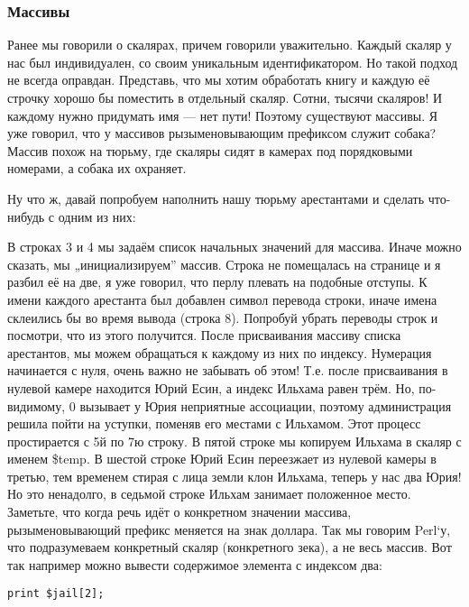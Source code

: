 \subsubsection{Массивы}

Ранее мы говорили о скалярах, причем говорили уважительно. Каждый скаляр 
у нас был индивидуален, со своим уникальным идентификатором. Но такой 
подход не всегда оправдан. Представь, что мы хотим обработать книгу и 
каждую её строчку хорошо бы поместить в отдельный скаляр. Сотни, тысячи 
скаляров! И каждому нужно придумать имя --- нет пути! Поэтому существуют 
массивы. Я уже говорил, что у массивов рызыменовывающим префиксом служит 
собака? Массив похож на тюрьму, где скаляры сидят в камерах под 
порядковыми номерами, а собака их охраняет.

Ну что ж, давай попробуем наполнить нашу тюрьму арестантами и сделать 
что-нибудь с одним из них:


В строках 3 и 4 мы задаём список начальных значений для массива. Иначе 
можно сказать, мы „инициализируем” массив. Строка не помещалась на 
странице и я разбил её на две, я уже говорил, что перлу плевать на подобные 
отступы. К имени каждого арестанта был добавлен символ перевода строки, 
иначе имена склеились бы во время вывода (строка 8). Попробуй убрать 
переводы строк и посмотри, что из этого получится. После присваивания 
массиву списка арестантов, мы можем обращаться к каждому из них по 
индексу. Нумерация начинается с нуля, очень важно не забывать об этом! Т.е. 
после присваивания в нулевой камере находится Юрий Есин, а индекс Ильхама 
равен трём. Но, по-видимому, 0 вызывает у Юрия неприятные ассоциации, 
поэтому администрация решила пойти на уступки, поменяв его местами с 
Ильхамом. Этот процесс простирается с 5й по 7ю строку. В пятой строке мы 
копируем Ильхама в скаляр с именем \$temp. В шестой строке Юрий Есин 
переезжает из нулевой камеры в третью, тем временем стирая с лица земли 
клон Ильхама, теперь у нас два Юрия! Но это ненадолго, в седьмой строке 
Ильхам занимает положенное место. Заметьте, что когда речь идёт о 
конкретном значении массива, рызыменовывающий префикс меняется на знак 
доллара. Так мы говорим Perl`у, что подразумеваем конкретный скаляр 
(конкретного зека), а не весь массив. Вот так например можно вывести
содержимое элемента с индексом два:

\begin{verbatim}
print $jail[2];
\end{verbatim}

